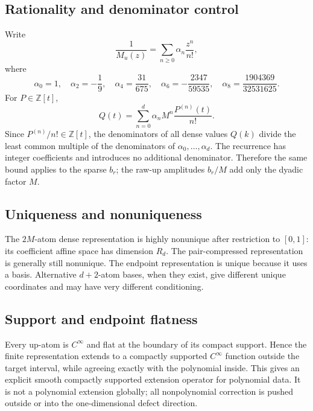 \documentclass[11pt,oneside]{article}
\theoremstyle{definition}
\theoremstyle{remark}
\newcommand{\Z}{\mathbb Z}
\begin{document}
\subsection{Rationality and denominator control}
Write
\begin{equation}
 \frac1{M_u(z)}=\sum_{n\ge0}\alpha_n\frac{z^n}{n!},       \label{eq:alpha-egf}
\end{equation}
where
\begin{equation}
 \alpha_0=1,\quad
 \alpha_2=-\frac19,\quad
 \alpha_4=\frac{31}{675},\quad
 \alpha_6=-\frac{2347}{59535},\quad
 \alpha_8=\frac{1904369}{32531625}.                      \label{eq:alpha-values}
\end{equation}
For $P\in\Z[t]$,
\begin{equation}
 Q(t)=\sum_{n=0}^{d}\alpha_n M^n\frac{P^{(n)}(t)}{n!}.   \label{eq:Q-alpha}
\end{equation}
Since $P^{(n)}/n!\in\Z[t]$, the denominators of all dense values $Q(k)$ divide the least common multiple of the denominators of $\alpha_0,\ldots,\alpha_d$.  The recurrence has integer coefficients and introduces no additional denominator.  Therefore the same bound applies to the sparse $b_r$; the raw-up amplitudes $b_r/M$ add only the dyadic factor $M$.

\subsection{Uniqueness and nonuniqueness}
The $2M$-atom dense representation is highly nonunique after restriction to $[0,1]$: its coefficient affine space has dimension $R_d$.  The pair-compressed representation is generally still nonunique.  The endpoint representation is unique because it uses a basis.  Alternative $d+2$-atom bases, when they exist, give different unique coordinates and may have very different conditioning.

\subsection{Support and endpoint flatness}
Every up-atom is $C^\infty$ and flat at the boundary of its compact support.  Hence the finite representation extends to a compactly supported $C^\infty$ function outside the target interval, while agreeing exactly with the polynomial inside.  This gives an explicit smooth compactly supported extension operator for polynomial data.  It is not a polynomial extension globally; all nonpolynomial correction is pushed outside or into the one-dimensional defect direction.
\end{document}
